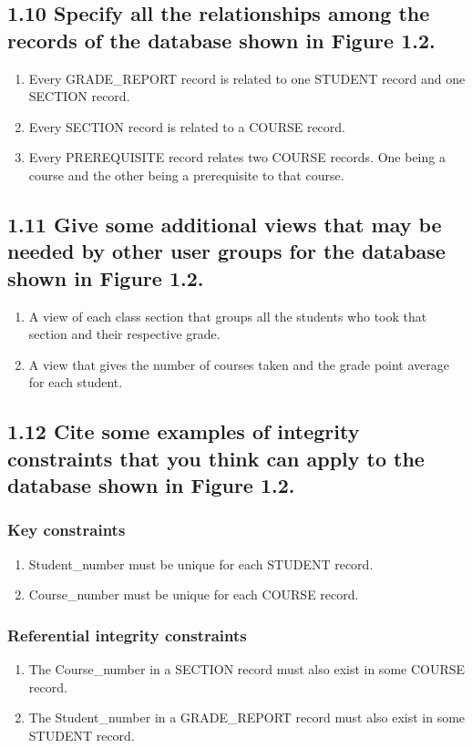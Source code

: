 \documentclass[11pt, oneside]{article}   	%
\begin{document}
\subsection*{1.10 Specify all the relationships among the records of the database shown in Figure 1.2.}
\begin{enumerate}
\item Every GRADE\_REPORT record is related to one STUDENT record and one SECTION record.
\item Every SECTION record is related to a COURSE record.
\item Every PREREQUISITE record relates two COURSE records. One being a course and the other being a prerequisite to that course.
\end{enumerate}

\subsection*{1.11 Give some additional views that may be needed by other user groups for the database shown in Figure 1.2.}
\begin{enumerate}
\item A view of each class section that groups all the students who took that section and their respective grade.
\item A view that gives the number of courses taken and the grade point average for each student.
\end{enumerate}

\subsection*{1.12 Cite some examples of integrity constraints that you think can apply to the database shown in Figure 1.2.}
\subsubsection*{Key constraints}
\begin{enumerate}
\item Student\_number must be unique for each STUDENT record.
\item Course\_number must be unique for each COURSE record.
\end{enumerate}

\subsubsection*{Referential integrity constraints}
\begin{enumerate}
\item The Course\_number in a SECTION record must also exist in some COURSE record.
\item The Student\_number in a GRADE\_REPORT record must also exist in some STUDENT record.
\end{enumerate}
\end{document}
